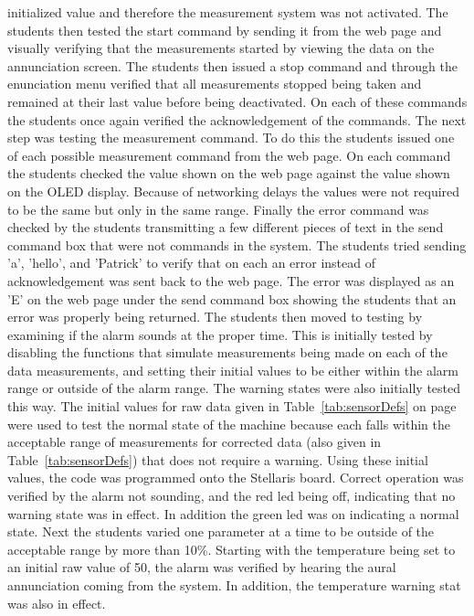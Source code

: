\documentclass[12pt]{article} %
\begin{document}
initialized value and therefore the measurement system was not activated. The students then tested the start command by sending it from 
the web page and visually verifying that the measurements started by viewing the data on the annunciation screen. The 
students then issued a stop command and through the enunciation menu verified that all measurements stopped being taken 
and remained at their last value before being deactivated. On each of these commands the students once again verified the acknowledgement of the commands.
The next step was testing the measurement command. To do this the students issued one of each possible measurement command from the web page. 
On each command the students checked the value shown on the web page against the value shown on the OLED display. Because of networking delays the values were 
not required to be the same but only in the same range. Finally the error command was checked by the students transmitting a few different pieces of text in the 
send command box that were not commands in the system. The students tried sending 'a', 'hello', and 'Patrick' to verify that on each an 
error instead of acknowledgement was sent back to the web page. The error was displayed as an 'E' on the web page under the send command box
showing the students that an error was properly being returned.
The students then moved to testing by examining if the
    alarm sounds at the proper time. This is initially tested by disabling the
    functions that simulate measurements being made on each of the data
    measurements, and setting their initial values to be either within the
    alarm range or outside of the alarm range. The warning states were also
    initially tested this way. The initial values for raw data given in
    Table~\ref{tab:sensorDefs} on page \pageref{tab:sensorDefs} were used to
    test the normal state of the machine because each falls within the
    acceptable range of measurements for corrected data (also given in
    Table~\ref{tab:sensorDefs}) that does not require a warning.  Using these
    initial values, the code was programmed onto the Stellaris board.  Correct
    operation was verified by the alarm not sounding, and the red led being
    off, indicating that no warning state was in effect. In addition the green
    led was on indicating a normal state. Next the students varied one
    parameter at a time to be outside of the acceptable range by more than
    10\%. Starting with the temperature being set to an initial raw value of
    50, the alarm was verified by hearing the aural annunciation coming from
    the system. In addition, the temperature warning stat was also in effect.
\end{document}

